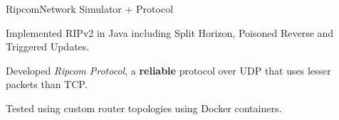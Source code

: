 \begin{rSubsection}{Ripcom}{\em }{Network Simulator + Protocol}{}
    \item Implemented RIPv2 in Java including Split Horizon, Poisoned Reverse and Triggered Updates.
    \item Developed \textit{Ripcom Protocol}, a \textbf{reliable} protocol over UDP that uses lesser packets than TCP.
    \item Tested using custom router topologies using Docker containers.
\end{rSubsection}